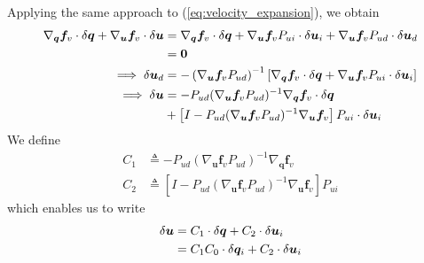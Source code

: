 \documentclass{svjour3}                     %
\begin{document}
Applying the same approach to (\ref{eq:velocity_expansion}), we obtain
\begin{align}
  \nabla_{\bm{q}}\bm{f}_{v} \cdot \delta \bm{q} +
  \nabla_{\bm{u}}\bm{f}_{v} \cdot \delta \bm{u} &= \nabla_{\bm{q}} \bm{f}_{v} \cdot
\delta \bm{q} + \nabla_{\bm{u}} \bm{f}_{v} P_{ui} \cdot \delta \bm{u}_i +
\nabla_{\bm{u}} \bm{f}_{v} P_{ud} \cdot \delta \bm{u}_d \notag\\
&= \bm{0}\notag\\
\implies \delta \bm{u}_d &= -\left(\nabla_{\bm{u}} \bm{f}_{v}
P_{ud}\right)^{-1}\left[\nabla_{\bm{q}}\bm{f}_{v} \cdot \delta\bm{q} +
  \nabla_{\bm{u}} \bm{f}_{v} P_{ui} \cdot \delta \bm{u}_i \right]\notag\\
  \implies \delta \bm{u} &= -P_{ud}(\nabla_{\bm{u}} \bm{f}_{v} P_{ud})^{-1}
  \nabla_{\bm{q}} \bm{f}_{v} \cdot \delta \bm{q}\notag\\
  &+ \left[I - P_{ud} (\nabla_{\bm{u}}\bm{f}_{v} P_{ud})^{-1} \nabla_{\bm{u}}
    \bm{f}_{v} \right] P_{ui} \cdot \delta \bm{u}_i
\end{align}
We define
\begin{align}
  \label{eq:C_1}
  C_1 &\triangleq -P_{ud}(\nabla_{\bm{u}} \bm{f}_{v} P_{ud})^{-1}
  \nabla_{\bm{q}} \bm{f}_{v} \\
  \label{eq:C_2}
  C_2 &\triangleq \left[I - P_{ud} (\nabla_{\bm{u}}\bm{f}_{v} P_{ud})^{-1} \nabla_{\bm{u}}
    \bm{f}_{v} \right] P_{ui}
\end{align}
which enables us to write
\begin{align}
  \label{eq:delta_u}
  \delta \bm{u} &= C_1 \cdot \delta \bm{q} + C_2 \cdot \delta \bm{u}_i\notag\\
  &= C_1 C_0 \cdot \delta \bm{q}_i + C_2 \cdot \delta \bm{u}_i
\end{align}
\end{document}
